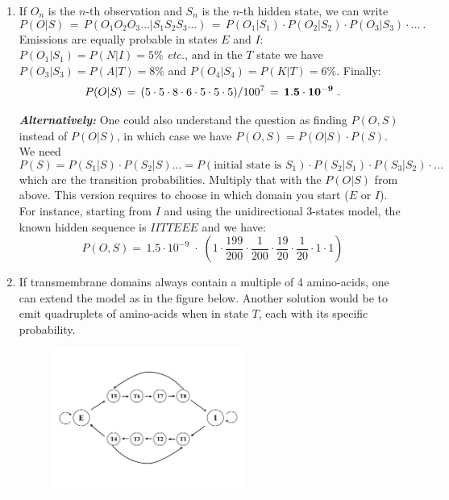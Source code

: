 \documentclass[a4paper,11pt]{article}
\begin{document}
\begin{enumerate}
\item If $O_n$ is the $n$-th observation and $S_n$ is the $n$-th
  hidden state, we can write 
$$
P(O|S)
\, =\, P(O_1O_2O_3\dots | S_1S_2S_3\dots)
\, =\, P(O_1|S_1)\cdot P(O_2|S_2)\cdot P(O_3|S_3)\cdot \dots~.
$$
Emissions are equally probable in states $E$ and $I$: $P(O_1|S_1) =
P(N|I) = 5\%$ \textit{etc.}, and in the $T$ state we have
$P(O_3|S_3) = P(A|T) = 8\%$ and $P(O_4|S_4) = P(K|T) = 6\%$.
Finally:
$$
P(O|S)\, = \,(5\cdot 5\cdot 8\cdot 6\cdot 5\cdot 5\cdot 5) / 100^{7}\,
=\, \bf{1.5\cdot 10^{-9}}~.
$$

\textbf{\textit{Alternatively:}} One could also understand the question as finding $P(O,S)$ instead of $P(O|S)$, in which case 
we have $P(O,S) = P(O|S)\cdot P(S) $. We need 
$$
P(S) = P(S_1|S)\cdot P(S_2|S) ... = P(\text{initial state is } S_1)\cdot P(S_2|S_1) \cdot P(S_3|S_2)\cdot ...  
$$
which are the transition probabilities. Multiply that with the $P(O|S)$ from above. This version requires to choose
in which domain you start ($E$ or $I$). For instance, starting from $I$ and using the unidirectional 3-states model,
the known hidden sequence is $IITTEEE$ and we have:
$$
P(O,S) = \,1.5\cdot 10^{-9}\; \cdot \; (1\cdot \frac{199}{200}\cdot \frac{1}{200}\cdot \frac{19}{20}\cdot \frac{1}{20}
\cdot 1\cdot 1)
$$

\item If transmembrane domains always contain a multiple of 4 amino-acids, one can extend the model as in the figure below.
Another solution would be to emit quadruplets of amino-acids when in state $T$, each with its specific probability.

\begin{figure}[hbt]
\centering
\includegraphics[width=0.6\textwidth]{hmm_graph3.pdf}
\end{figure}

\end{enumerate}

\pagebreak
\end{document}
